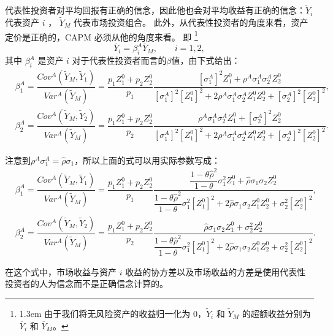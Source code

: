 \documentclass[10.0pt]{article}
\begin{document}
代表性投资者对平均回报有正确的信念，因此他也会对平均收益有正确的信念：$ \tilde{Y}_i $ 代表资产 $i$ ， $ \tilde{Y}_M $ 代表市场投资组合。 此外，从代表性投资者的角度来看，资产定价是正确的，CAPM 必须从他的角度来看。 即 \footnote{\baselineskip1.3em 由于我们将无风险资产的收益归一化为 0，$ \tilde{Y}_i $ 和 $ \tilde{Y}_M $ 的超额收益分别为 $ \overline{ Y}_i $ 和 $ \overline{Y}_M $。}
\begin{equation}
\overline{Y}_i = \beta_i^A \overline{Y}_M, \qquad i = 1, 2,
\end{equation}
其中 $ \beta_i^A $ 是资产 $i$ 对于代表性投资者而言的$\beta$值，由下式给出：
\begin{eqnarray*}
& \beta_1^A = \dfrac{Cov^A (\tilde{Y}_M, \tilde{Y}_1)}{Var^A (\tilde{Y}_M)} = \dfrac{p_1 Z_1^0 + p_2 Z_2^0}{p_1} \dfrac{\left[ \sigma_1^A \right]^2 Z_1^0 + \rho^A \sigma_1^A \sigma_2^A Z_2^0}{\left[ \sigma_1^A \right]^2 \left[ Z_1^0 \right]^2 + 2 \rho^A \sigma_1^A \sigma_2^A Z_1^0 Z_2^0 + \left[ \sigma_2^A \right]^2 \left[ Z_2^0 \right]^2}, & \\
& \beta_2^A = \dfrac{Cov^A (\tilde{Y}_M, \tilde{Y}_2)}{Var^A (\tilde{Y}_M)} = \dfrac{p_1 Z_1^0 + p_2 Z_2^0}{p_2} \dfrac{\rho^A \sigma_1^A \sigma_2^A Z_1^0 + \left[ \sigma_2^A \right]^2 Z_2^0}{\left[ \sigma_1^A \right]^2 \left[ Z_1^0 \right]^2 + 2 \rho^A \sigma_1^A \sigma_2^A Z_1^0 Z_2^0 + \left[ \sigma_2^A \right]^2 \left[ Z_2^0 \right]^2}. &
\end{eqnarray*}


注意到$ \rho^A \sigma_1^A = \hat{\rho} \sigma_1 $，所以上面的式可以用实际参数写成：
\begin{eqnarray*}
& \beta_1^A = \dfrac{Cov^A (\tilde{Y}_M, \tilde{Y}_1)}{Var^A (\tilde{Y}_M)} = \dfrac{p_1 Z_1^0 + p_2 Z_2^0}{p_1} \dfrac{\dfrac{1 - \theta \hat{\rho}^2}{1 - \theta} \sigma_1^2 Z_1^0 + \hat{\rho} \sigma_1 \sigma_2 Z_2^0}{\dfrac{1 - \theta \hat{\rho}^2}{1 - \theta} \sigma_1^2 \left[ Z_1^0 \right]^2 + 2 \hat{\rho} \sigma_1 \sigma_2 Z_1^0 Z_2^0 + \sigma_2^2 \left[ Z_2^0 \right]^2}, & \\
& \beta_2^A = \dfrac{Cov^A (\tilde{Y}_M, \tilde{Y}_2)}{Var^A (\tilde{Y}_M)} = \dfrac{p_1 Z_1^0 + p_2 Z_2^0}{p_2}
\dfrac{\hat{\rho} \sigma_1 \sigma_2 Z_1^0 + \sigma_2^2 Z_2^0}{\dfrac{1 - \theta \hat{\rho}^2}{1 - \theta} \sigma_1^2 \left[ Z_1^0 \right]^2 + 2 \hat{\rho} \sigma_1 \sigma_2 Z_1^0 Z_2^0 + \sigma_2^2 \left[ Z_2^0 \right]^2}. &
\end{eqnarray*}



在这个式中，市场收益与资产 $i$ 收益的协方差以及市场收益的方差是使用代表性投资者的人为信念而不是正确信念计算的。
\end{document}
